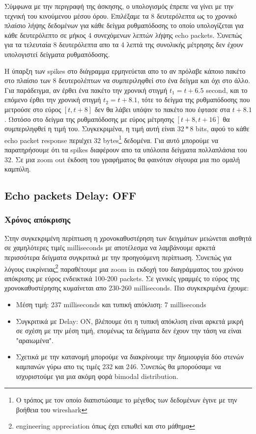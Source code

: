 \documentclass[hidelinks, 12pt, a4paper]{article}
\begin{document}
Σύμφωνα με την περιγραφή της άσκησης, ο υπολογισμός έπρεπε να γίνει με την τεχνική του κινούμενου μέσου όρου. Επιλέξαμε τα 8 δευτερόλεπτα ως το χρονικό πλαίσιο λήψης δεδομένων για κάθε δείγμα ρυθμαπόδοσης το οποίο υπολογίζεται για κάθε δευτερόλεπτο σε μήκος 4 συνεχόμενων λεπτών λήψης echo packets. Συνεπώς για τα τελευταία 8 δευτερόλεπτα απο τα 4 λεπτά της συνολικής μέτρησης δεν έχουν υπολογιστεί δείγματα ρυθμαπόδοσης. 

Η ύπαρξη των spikes στο διάγραμμα ερμηνεύεται απο το αν πρόλαβε κάποιο πακέτο στο πλαίσιο των 8 δευτερολέπτων να συμπεριληφθεί στο ένα δείγμα και όχι στο άλλο. Για παράδειγμα, αν έρθει ένα πακέτο την χρονική στιγμή $t_1 = t + 6.5$ second, και το επόμενο έρθει την χρονική στιγμή $t_2 = t + 8.1$, τότε το δείγμα της ρυθμαπόδοσης που μετρούσε στο εύρος $[t, t+8]$ δεν θα λάβει υπόψιν το πακέτο που έφτασε στα $t + 8.1$. Ωστόσο στο δείγμα της ρυθμαπόδοσης με εύρος μέτρησης $[t+8, t+16]$ θα συμπεριληφθεί η τιμή του. Συγκεκριμένα, η τιμή αυτή είναι $32*8$ bits, αφού το κάθε echo packet response περιέχει 32 bytes\footnote{Ο τρόπος με τον οποίο διαπιστώσαμε το μέγεθος των δεδομένων έγινε με την βοήθεια του wireshark} δεδομένα. Για αυτό μπορούμε να παρατηρήσουμε ότι τα spikes διαφέρουν απο τα υπόλοιπα δείγματα πολλαπλάσια του $32$. Σε μια zoom out έκδοση του γραφήματος θα φαινόταν σίγουρα μια πιο ομαλή καμπύλη.


\subsection{Echo packets Delay: OFF}

\subsubsection{Χρόνος απόκρισης}
Στην συγκεκριμένη περίπτωση η χρονοκαθυστέρηση των δειγμάτων μειώνεται αισθητά σε χαμηλότερες τιμές milliseconds με αποτέλεσμα να λαμβάνουμε αρκετά περισσότερα δείγματα συγκριτικά με την προηγούμενη περίπτωση. Συνεπώς για λόγους ευκρίνειας\footnote{engineering appreciation όπως έχει ειπωθεί και στο μάθημα} παραθέτουμε μια zoom in εκδοχή του διαγράμματος του χρόνου απόκρισης με εύρος ενδεικτικά 100-200 packets. Σε γενικές γραμμές το εύρος της χρονοκαθυστέρησης κυμαίνεται απο 230-260 milliseconds. Πιο συγκεκριμένα έχουμε:
\begin{itemize}
    \item Μέση τιμή: 237 milliseconds και τυπική απόκλιση: 7 milliseconds 
    \item Συγκριτικά με Delay: ON, βλέπουμε ότι η τυπική απόκλιση είναι αρκετά μικρή σε σχέση με την μέση τιμή, επομένως τα δείγματα δεν έχουν την τάση να είναι "αραιωμένα".
    \item Σχετικά με την κατανομή μπορούμε να διακρίνουμε την δημιουργία δύο στενών καμπανών γύρω απο τις τιμές 232 και 246. Συνεπώς θα μπορούσαμε να ισχυριστούμε για μια ακόμη φορά bimodal distribution. 
\end{itemize}
\end{document}
